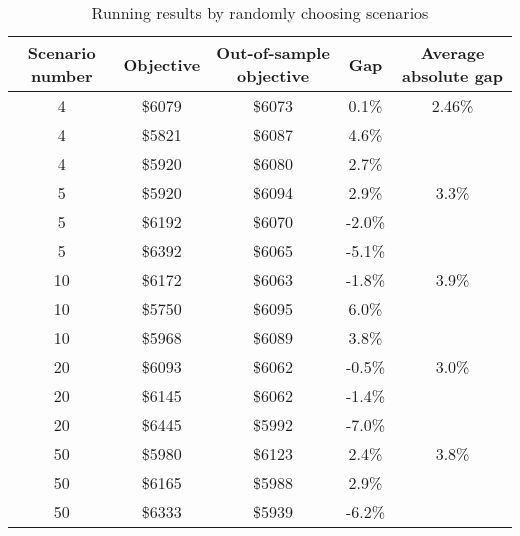\begin{table}[h]
    \centering
    \begin{tabular}{|c|c|c|c|c|}
    \hline
      \textbf{Scenario number}   & \textbf{Objective}  & \textbf{Out-of-sample objective} &\textbf{Gap} &\textbf{Average absolute gap}\\
         \hline
     4   & \$6079& \$6073 & 0.1\% &2.46\%\\\hline
      4    & \$5821& \$6087 & 4.6\% &\\\hline
       4    & \$5920& \$6080 & 2.7\% &\\\hline
            5   & \$5920& \$6094 & 2.9\%&3.3\% \\\hline
      5    & \$6192& \$6070 & -2.0\%& \\\hline
       5    & \$6392& \$6065 & -5.1\%& \\\hline
                   10   & \$6172& \$6063 & -1.8\% &3.9\%\\\hline
      10    & \$5750& \$6095 & 6.0\% &\\\hline
       10    & \$5968& \$6089 & 3.8\% &\\\hline
                          20   & \$6093& \$6062 & -0.5\%&3.0\% \\\hline
      20    & \$6145& \$6062 & -1.4\% &\\\hline
       20    & \$6445& \$5992 & -7.0\% &\\\hline
           50   & \$5980& \$6123 & 2.4\%&3.8\% \\\hline
     50 & \$6165& \$5988 & 2.9\%& \\\hline
     50    & \$6333& \$5939 &-6.2\%& \\\hline
    \end{tabular}
    \caption{Running results by randomly choosing scenarios}
    \label{tab:stocha}
\end{table}

